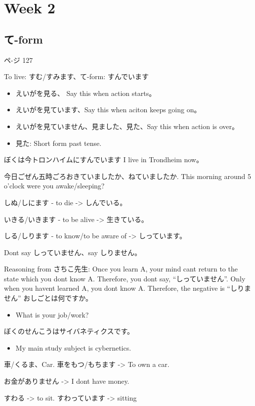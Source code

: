 \section{Week 2}
\subsection{て-form}
ペ-ジ 127

To live: すむ/すみます、て-form: すんでいます

\begin{itemize}
    \item えいがを見る、 Say this when action starts。
    \item えいがを見ています、Say this when aciton keeps going on。
    \item えいがを見ていません、見ました、見た、Say this when action is over。
    \item 見た: Short form past tense.
\end{itemize}


ぼくは今トロンハイムにすんでいます I live in Trondheim now。

今日ごぜん五時ごろおきていましたか、ねていましたか. This morning around 5 o'clock
 were you awake/sleeping?

しぬ/しにます - to die -> しんでいる。

いきる/いきます - to be alive -> 生きている。

しる/しります - to know/to be aware of -> しっています。

Dont say しっていません、say しりません。

Reasoning from さちこ先生: Once you learn A, your mind cant return to the state which you dont know A. Therefore,
you dont say, “しっていません”. Only when you havent learned A, you dont know A. Therefore,
the negative is “しりません”
\vfill
おしごとは何ですか。
\begin{itemize}
    \item What is your job/work?
\end{itemize}

ぼくのせんこうはサイバネティクスです。
\begin{itemize}
    \item My main study subject is cybernetics.
\end{itemize}

車/くるま、Car. 車をもつ/もちます -> To own a car.

お金がありません -> I dont have money.

すわる -> to sit. すわっています -> sitting

